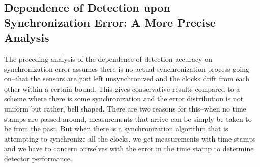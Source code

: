 \subsection{Dependence of Detection upon Synchronization Error: A More Precise
Analysis}\label{sec:tighter_analysis} The preceding analysis of the
dependence of detection accuracy on synchronization error assumes
there is no actual synchronization process going on--that the
sensors are just left unsynchronized and the clocks drift from each
other within a certain bound. This gives conservative results
compared to a scheme where there is some synchronization and the
error distribution is not uniform but rather, bell shaped. There are
two reasons for this--when no time stamps are passed around,
measurements that arrive can be simply be taken to be from the past.
But when there is a synchronization algorithm that is attempting to
synchronize all the clocks, we get measurements with time stamps and
we have to concern ourselves with the error in the time stamp to
determine detector performance.

